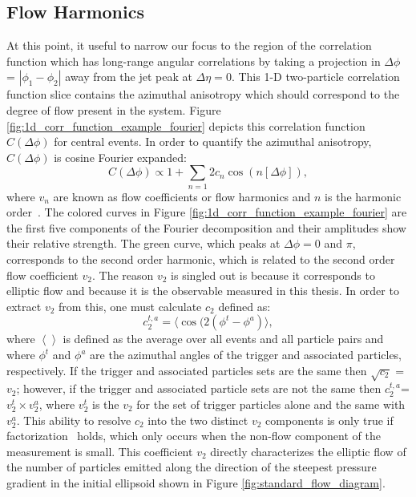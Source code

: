 \subsection{Flow Harmonics}
At this point, it useful to narrow our focus to the region of the correlation function which has long-range angular correlations by taking a projection in $\Delta\phi$ = $|\phi_1 - \phi_2|$ away from the jet peak at $\Delta\eta = 0$. This 1-D two-particle correlation function slice contains the azimuthal anisotropy which should correspond to the degree of flow present in the system. Figure \ref{fig:1d_corr_function_example_fourier} depicts this correlation function $C(\Delta\phi)$ for central \pbpb events. In order to quantify the azimuthal anisotropy, $C(\Delta\phi)$ is cosine Fourier expanded:
\begin{equation}\label{eqn:dndphi}
  C(\Delta\phi) \propto 1 + \sum_{n=1}2 c_{n}\cos(n[\Delta\phi]),
\end{equation}
where $v_n$ are known as flow coefficients or flow harmonics and $n$ is the harmonic order~\cite{Voloshin1996}. The colored curves in Figure \ref{fig:1d_corr_function_example_fourier} are the first five components of the Fourier decomposition and their amplitudes show their relative strength. The green curve, which peaks at $\Delta\phi = 0$ and $\pi$, corresponds to the second order harmonic, which is related to the second order flow coefficient $v_2$. The reason $v_2$ is singled out is because it corresponds to elliptic flow and because it is the observable measured in this thesis. In order to extract $v_2$ from this, one must calculate $c_2$ defined as:
\begin{equation}
  c_2^{t,a} = \langle\cos(2(\phi^t-\phi^a)\rangle,
\end{equation}
where $\left<\right>$ is defined as the average over all events  and all particle pairs and where $\phi^t$ and $\phi^a$ are the azimuthal angles of the trigger and associated particles, respectively. If the trigger and associated particles sets are the same then $\sqrt{c_2}$ = $v_2$; however, if the trigger and associated particle sets are not the same then $c_2^{t,a} $=$v_2^{t}\times v_2^{a}$, where $v_2^{t}$ is the $v_2$ for the set of trigger particles alone and the same with $v_2^a$. This ability to resolve $c_2$ into the two distinct $v_2$ components is only true if factorization~\cite{PhysRevC.87.031901} holds, which only occurs when the non-flow component of the measurement is small. This coefficient $v_2$ directly characterizes the elliptic flow of the number of particles emitted along the direction of the steepest pressure gradient in the initial ellipsoid shown in Figure \ref{fig:standard_flow_diagram}.
